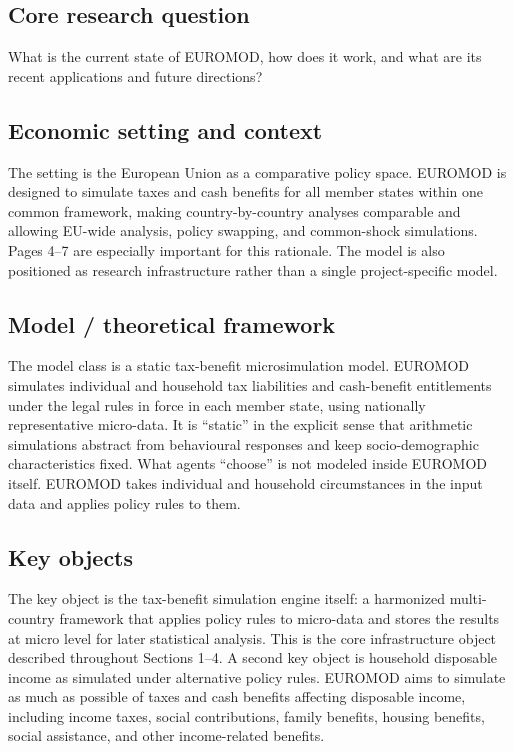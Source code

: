 \documentclass[11pt,a4paper]{article}
\begin{document}
\subsection*{Core research question}
What is the current state of EUROMOD, how does it work, and what are its recent applications and future directions?

\subsection*{Economic setting and context}
The setting is the European Union as a comparative policy space. EUROMOD is designed to simulate taxes and cash benefits for all member states within one common framework, making country-by-country analyses comparable and allowing EU-wide analysis, policy swapping, and common-shock simulations. Pages 4–7 are especially important for this rationale. The model is also positioned as research infrastructure rather than a single project-specific model.

\subsection*{Model / theoretical framework}
The model class is a static tax-benefit microsimulation model. EUROMOD simulates individual and household tax liabilities and cash-benefit entitlements under the legal rules in force in each member state, using nationally representative micro-data. It is “static” in the explicit sense that arithmetic simulations abstract from behavioural responses and keep socio-demographic characteristics fixed. What agents “choose” is not modeled inside EUROMOD itself. EUROMOD takes individual and household circumstances in the input data and applies policy rules to them.

\subsection*{Key objects}
The key object is the tax-benefit simulation engine itself: a harmonized multi-country framework that applies policy rules to micro-data and stores the results at micro level for later statistical analysis. This is the core infrastructure object described throughout Sections 1–4. A second key object is household disposable income as simulated under alternative policy rules. EUROMOD aims to simulate as much as possible of taxes and cash benefits affecting disposable income, including income taxes, social contributions, family benefits, housing benefits, social assistance, and other income-related benefits.
\end{document}

